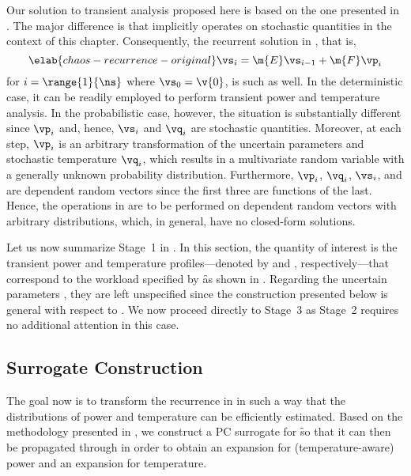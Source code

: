 Our solution to transient analysis proposed here is based on the one presented
in . The major difference is that
 implicitly operates on stochastic quantities in the
context of this chapter. Consequently, the recurrent solution in
, that is,
\begin{equation} \elab{chaos-recurrence-original}
  \vs_i = \m{E} \vs_{i - 1} + \m{F} \vp_i
\end{equation}
for $i = \range{1}{\ns}$ where $\vs_0 = \v{0}$, is such as well. In the
deterministic case, it can be readily employed to perform transient power and
temperature analysis. In the probabilistic case, however, the situation is
substantially different since $\vp_i$ and, hence, $\vs_i$ and $\vq_i$ are
stochastic quantities. Moreover, at each step, $\vp_i$ is an arbitrary
transformation of the uncertain parameters \vu and stochastic temperature
$\vq_i$, which results in a multivariate random variable with a generally
unknown probability distribution. Furthermore, $\vp_i$, $\vq_i$, $\vs_i$, and
\vu are dependent random vectors since the first three are functions of the
last. Hence, the operations in  are to be
performed on dependent random vectors with arbitrary distributions, which, in
general, have no closed-form solutions.

Let us now summarize Stage~1 in . In this section, the
quantity of interest \g is the transient power and temperature
profiles---denoted by \mp and \mq, respectively---that correspond to the
workload specified by \f as shown in . Regarding the
uncertain parameters \vu, they are left unspecified since the construction
presented below is general with respect to \vu. We now proceed directly to
Stage~3 as Stage~2 requires no additional attention in this case.


\subsection{Surrogate Construction}

The goal now is to transform the recurrence in 
in such a way that the distributions of power and temperature can be efficiently
estimated. Based on the methodology presented in
, we construct a \ac{PC} surrogate for \f so
that it can then be propagated through  in order
to obtain an expansion for (temperature-aware) power and an expansion for
temperature.

